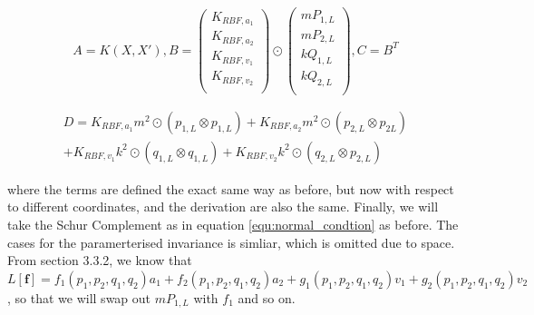 \documentclass{statsmsc}
\begin{document}
$$
A=K(X, X'), 
B=\begin{pmatrix}
    K_{RBF, a_1}\\
    K_{RBF, a_2}\\
    K_{RBF, v_1}\\
    K_{RBF, v_2}\\
\end{pmatrix}\odot
\begin{pmatrix}
mP_{1,L}  \\
mP_{2,L}  \\
kQ_{1,L}  \\
kQ_{2,L}  \\
\end{pmatrix},
C=B^T 
$$

\begin{gather*}
D=K_{RBF,a_1}m^2\odot(p_{1,L}\otimes p_{1,L}) + K_{RBF,a_2}m^2\odot(p_{2,L}\otimes p_{2L})\\+K_{RBF,v_1}k^2\odot(q_{1,L}\otimes q_{1,L})+K_{RBF,v_2}k^2\odot(q_{2,L}\otimes p_{2,L})
\end{gather*}

where the terms are defined the exact same way as before, but now with respect to different coordinates, and the derivation are also the same.
Finally, we will take the Schur Complement as in equation \ref{equ:normal_condtion} as before.
The cases for the paramerterised invariance is simliar, which is omitted due to space.
From section 3.3.2, we know that $L[\mathbf{f}]=f_1(p_1, p_2, q_1, q_2)a_1+f_2(p_1, p_2, q_1, q_2)a_2+g_1(p_1, p_2, q_1, q_2)v_1+g_2(p_1, p_2, q_1, q_2)v_2$, so that we will swap out $mP_{1,L}$ with $f_1$ and so on.
\end{document}
